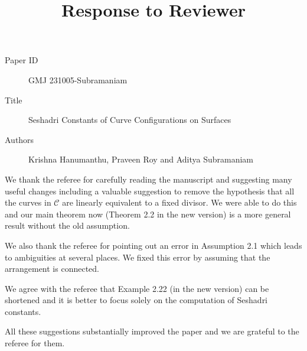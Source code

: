\documentclass[12pt,twoside,reqno]{amsart}
\numberwithin{equation}{section}
\theoremstyle{definition}
\begin{document}
\title{Response to Reviewer}
\begin{description}
\item[Paper ID]  GMJ 231005-Subramaniam

\item [Title] Seshadri Constants of Curve Configurations on Surfaces
\item [Authors] Krishna Hanumanthu, Praveen Roy and Aditya Subramaniam
\end{description}

We thank the referee for carefully reading the manuscript and suggesting 
many useful changes including a valuable suggestion to remove the hypothesis that all the curves in $\mathcal{C}$ are linearly equivalent to a fixed divisor. We were able to do this and our main theorem now (Theorem 2.2 in the new version) is a more general result without the old assumption. 

We also thank the referee for pointing out an error in  Assumption 2.1 which leads to 
ambiguities at several places. We fixed this error by assuming that the arrangement is connected. 

We  agree with the referee that Example 2.22 (in the new version)  can be shortened and it is better to  
focus solely on the computation of Seshadri constants. 

All these suggestions substantially improved the paper and we are grateful to the referee for them. 
\end{document}

